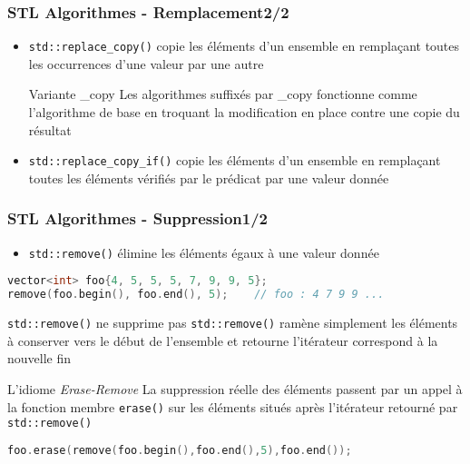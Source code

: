\documentclass[C++.tex]{subfiles}
\begin{document}
\begin{frame}[fragile]
	\frametitle{STL Algorithmes - Remplacement\titlehfill{}2/2}
	\begin{itemize}
		\item \lstinline|std::replace_copy()| copie les éléments d'un ensemble en remplaçant toutes les occurrences d'une valeur par une autre
		\begin{block}{Variante \og \_copy\fg{}}
			Les algorithmes suffixés par \_copy fonctionne comme l'algorithme de base en troquant la modification en place contre une copie du résultat
		\end{block}
		\item \lstinline|std::replace_copy_if()| copie les éléments d'un ensemble en remplaçant toutes les éléments vérifiés par le prédicat par une valeur donnée
	\end{itemize}
\end{frame}

\begin{frame}[fragile]
	\frametitle{STL Algorithmes - Suppression\titlehfill{}1/2}
	\begin{itemize}
		\item \lstinline|std::remove()| \og élimine\fg{} les éléments égaux à une valeur donnée
	\end{itemize}

	\begin{lstlisting}[language=C++]
vector<int> foo{4, 5, 5, 5, 7, 9, 9, 5};
remove(foo.begin(), foo.end(), 5);    // foo : 4 7 9 9 ...\end{lstlisting}


	\pause

	\begin{alertblock}{\lstinline|std::remove()| ne supprime pas}
		\lstinline|std::remove()| ramène simplement  les éléments à conserver vers le début de l'ensemble et retourne l'itérateur correspond à la nouvelle fin
	\end{alertblock}


	\pause

	\begin{block}{L'idiome \textit{Erase-Remove}}
		La suppression réelle des éléments passent par un appel à la fonction membre \lstinline|erase()| sur les éléments situés après l'itérateur retourné par \lstinline|std::remove()|
	
		\begin{lstlisting}[language=C++]
foo.erase(remove(foo.begin(),foo.end(),5),foo.end());\end{lstlisting}
	\end{block}
\end{frame}
\end{document}

